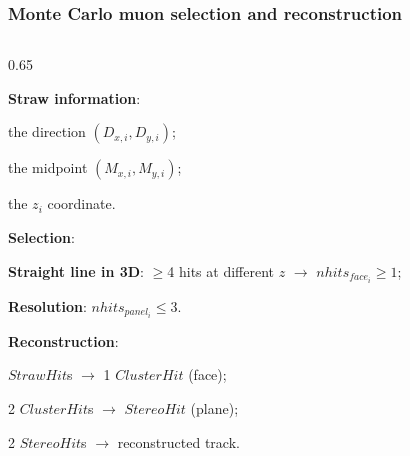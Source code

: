 \documentclass{beamer}
\begin{document}
\begin{frame}
    \frametitle{Monte Carlo muon selection and reconstruction}
\vspace{-4.6mm}
    \begin{columns}
\begin{column}{0.65\framewidth}
   \setlength{\leftmargini}{1.2em}
   \begin{itemize}
{\footnotesize \item \textbf{Straw information}:}
\vspace{2mm}
\begin{itemize}
    {\footnotesize \item the direction $(D_{x,i},D_{y,i})$;
    \vspace{1mm}
    \item the midpoint $(M_{x,i},M_{y,i})$;
    \vspace{1mm}
    \item the $z_i$ coordinate.}
\end{itemize} 
\vspace{4mm}
 {\footnotesize
 \item \textbf{Selection}:}
 \vspace{2mm}
  \begin{itemize}
   {\footnotesize 
    \item \textbf{Straight line in 3D}: $\geq$4 hits at different $z$ $\rightarrow$ $nhits_{face_i}\geq 1$;
    \vspace{1mm}
    \item \textbf{Resolution}: $nhits_{panel_i}\leq 3$.}
    \end{itemize} 
    \vspace{4mm}
 {\footnotesize \item \textbf{Reconstruction}: }
 \vspace{2mm}
        \begin{itemize}
        {\footnotesize \item $StrawHit$s $\rightarrow$ 1 $ClusterHit$ (face);
        \vspace{1mm}
          \item 2 $ClusterHit$s $\rightarrow$ $StereoHit$ (plane);
          \vspace{1mm}
          \item 2 $StereoHit$s $\rightarrow$ reconstructed track.}
        \end{itemize}


\end{itemize}
\end{column}
\end{columns}
\end{frame}
\end{document}

